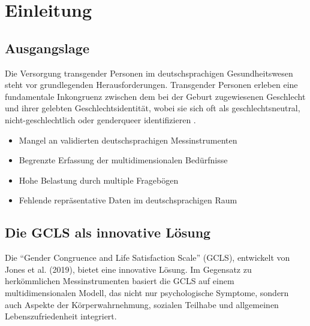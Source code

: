 \documentclass[11pt,a4paper]{article}
\begin{document}
\newpage

\tableofcontents
\newpage

\section{Einleitung}

\subsection{Ausgangslage}

Die Versorgung transgender Personen im deutschsprachigen Gesundheitswesen steht vor grundlegenden Herausforderungen. Transgender Personen erleben eine fundamentale Inkongruenz zwischen dem bei der Geburt zugewiesenen Geschlecht und ihrer gelebten Geschlechtsidentität, wobei sie sich oft als geschlechtsneutral, nicht-geschlechtlich oder genderqueer identifizieren \cite{Arcelus2017, Richards2017, Richards2016}.

\begin{tcolorbox}[colback=lightgray,colframe=mediumgray,title=\textbf{Aktuelle Herausforderungen},arc=2mm]
\begin{itemize}
    \item Mangel an validierten deutschsprachigen Messinstrumenten
    \item Begrenzte Erfassung der multidimensionalen Bedürfnisse
    \item Hohe Belastung durch multiple Fragebögen
    \item Fehlende repräsentative Daten im deutschsprachigen Raum
\end{itemize}
\end{tcolorbox}

\subsection{Die GCLS als innovative Lösung}

Die ``Gender Congruence and Life Satisfaction Scale'' (GCLS), entwickelt von Jones et al. (2019), bietet eine innovative Lösung. Im Gegensatz zu herkömmlichen Messinstrumenten basiert die GCLS auf einem multidimensionalen Modell, das nicht nur psychologische Symptome, sondern auch Aspekte der Körperwahrnehmung, sozialen Teilhabe und allgemeinen Lebenszufriedenheit integriert.
\end{document}
